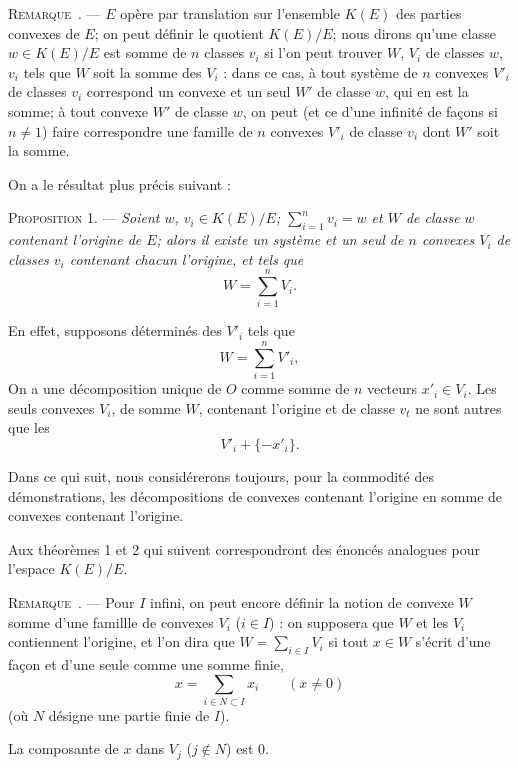 \documentclass[11pt]{article}
\newcommand{\bzcf}[2]{#1}
\newcommand{\bznum}[1]{\if\relax\detokenize{#1}\relax\else\ #1\fi}
\newenvironment{prop}[1][]{\par\medskip\noindent\textsc{Proposition #1.} --- \itshape}{\par\medskip}
\newenvironment{remarque}[1][]{\par\medskip\noindent\textsc{Remarque\bznum{#1}.} --- }{\par\medskip}
\newenvironment{proof}[1][]{\par}{\par}
\begin{document}
\begin{remarque}
$E$ opère par translation sur l'ensemble $K(E)$ des parties convexes de $E$; on peut définir le
quotient $K(E)/E$; nous dirons qu'une classe $w\in K(E)/E$ est somme de $n$ classes $v_i$ si l'on
peut trouver $W$, $V_i$ de classes $w$, $v_i$ tels que $W$ soit la somme des $V_i$ : dans ce cas,
à tout système de $n$ convexes $V'_i$ de classes $v_i$ correspond un convexe et un seul $W'$ de
classe $w$, qui en est la somme; à tout convexe $W'$ de classe $w$, on peut (et ce d'une infinité
de façons si $n\neq 1$) faire correspondre une famille de $n$ convexes $V'_i$ de classe $v_i$ dont
$W'$ soit la somme.
\end{remarque}

On a le résultat plus précis suivant :

\begin{prop}[1]
Soient $w$, $v_i\in K(E)/E$; $\sum_{i=1}^{n}v_i=w$ et $W$ de classe $w$ contenant l'origine de
$E$; alors il existe un système et un seul de $n$ convexes $V_i$ de classes $v_i$ contenant
chacun l'origine, et tels que
\[ W=\sum_{i=1}^{n}V_i. \]
\end{prop}

\begin{proof}
En effet, supposons déterminés des $V'_i$ tels que
\[ W=\sum_{i=1}^{n}V'_i, \]
On a une décomposition unique de $O$ comme somme de $n$ vecteurs $x'_i\in V_i$. Les seuls convexes
$V_i$, de somme $W$, contenant l'origine et de classe $v_t$ ne sont autres que les
\[ V'_i+\{-x'_i\}. \]
\end{proof}

Dans ce qui suit, nous considérerons toujours, pour la commodité des démonstrations, les
décompositions de convexes contenant l'origine en somme de convexes contenant l'origine.

Aux \bzcf{théorèmes 1}{\ref{bzthm:c3s2t1_conjugues_intersection}} et
\bzcf{2}{\ref{bzthm:c3s2t2_algebre_boole_affine}} qui suivent correspondront des énoncés analogues
pour l'espace $K(E)/E$.

\begin{remarque}
Pour $I$ infini, on peut encore définir la notion de convexe $W$ somme d'une famillle de convexes
$V_i$ ($i\in I$) : on supposera que $W$ et les $V_i$ contiennent l'origine, et l'on dira que
$W=\sum_{i\in I}V_i$ si tout $x\in W$ s'écrit d'une façon et d'une seule comme une somme finie,
\[ x=\sum_{i\in N\subset I}x_i\qquad(x\neq 0) \]
(où $N$ désigne une partie finie de $I$).

La composante de $x$ dans $V_j$ ($j\notin N$) est $0$.
\end{remarque}
\end{document}
